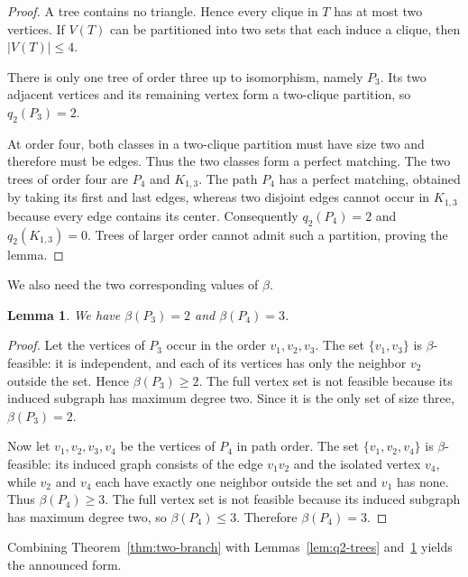 \documentclass[11pt,a4paper]{article}
\providecommand{\Needspace}[1]{}
\newtheorem{lemma}[theorem]{Lemma}
\numberwithin{equation}{section}
\begin{document}
\begin{proof}
A tree contains no triangle. Hence every clique in \(T\)
has at most two vertices. If \(V(T)\) can be partitioned into two sets
that each induce a clique, then \(|V(T)|\le 4\).

There is only one tree of order three up to isomorphism, namely \(P_3\).
Its two adjacent vertices and its remaining vertex form a two-clique
partition, so \(q_2(P_3)=2\).

At order four, both classes in a two-clique partition must have size two
and therefore must be edges. Thus the two classes form a perfect
matching. The two trees of order four are \(P_4\) and \(K_{1,3}\). The
path \(P_4\) has a perfect matching, obtained by taking its first and
last edges, whereas two disjoint edges cannot occur in \(K_{1,3}\)
because every edge contains its center. Consequently \(q_2(P_4)=2\) and
\(q_2(K_{1,3})=0\). Trees of larger order cannot admit such a partition,
proving the lemma.
\end{proof}

\Needspace{6\baselineskip}
We also need the two corresponding values of \(\beta\).

\begin{lemma}\label{lem:beta-small-paths}
We have \(\beta(P_3)=2\) and \(\beta(P_4)=3\).
\end{lemma}

\begin{proof}
Let the vertices of \(P_3\) occur in the order
\(v_1,v_2,v_3\). The set \(\{v_1,v_3\}\) is \(\beta\)-feasible: it is
independent, and each of its vertices has only the neighbor \(v_2\)
outside the set. Hence \(\beta(P_3)\ge 2\). The full vertex set is not
feasible because its induced subgraph has maximum degree two. Since it
is the only set of size three, \(\beta(P_3)=2\).

Now let \(v_1,v_2,v_3,v_4\) be the vertices of \(P_4\) in path order.
The set \(\{v_1,v_2,v_4\}\) is \(\beta\)-feasible: its induced graph
consists of the edge \(v_1v_2\) and the isolated vertex \(v_4\), while
\(v_2\) and \(v_4\) each have exactly one neighbor outside the set and
\(v_1\) has none. Thus \(\beta(P_4)\ge 3\). The full vertex set is not
feasible because its induced subgraph has maximum degree two, so
\(\beta(P_4)\le 3\). Therefore \(\beta(P_4)=3\).
\end{proof}

Combining Theorem~\ref{thm:two-branch} with Lemmas~\ref{lem:q2-trees}
and~\ref{lem:beta-small-paths} yields the announced form.
\end{document}
